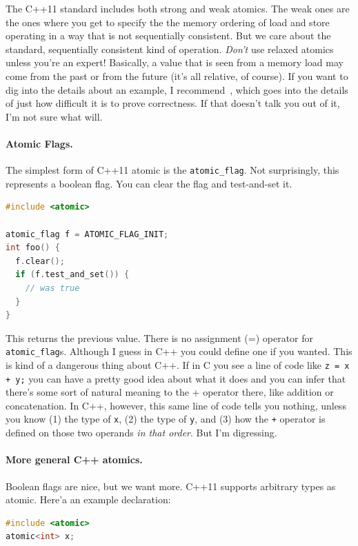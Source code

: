 \documentclass[a4paper]{report}
\begin{document}
The C++11 standard includes both strong and weak atomics. The weak ones are the ones where you get to specify the the memory ordering of load and store operating in a way that is not sequentially consistent. But we care about the standard, sequentially consistent kind of operation. \textit{Don't} use relaxed atomics unless you're an expert! Basically, a value that is seen from a memory load may come from the past or from the future (it's all relative, of course). If you want to dig into the details about an example, I recommend~\cite{bmref2}, which goes into the details of just how difficult it is to prove correctness. If that doesn't talk you out of it, I'm not sure what will.


\paragraph{Atomic Flags.} The simplest form of C++11 atomic is the {\tt atomic\_flag}.
Not surprisingly, this represents a boolean flag. You can clear the flag and test-and-set it.


\begin{lstlisting}[language=C++]
#include <atomic>

atomic_flag f = ATOMIC_FLAG_INIT;
int foo() {
  f.clear();
  if (f.test_and_set()) {
    // was true
  }
}
\end{lstlisting}

This returns the previous value. There is no assignment (=) operator for {\tt atomic\_flag}s. Although I guess in C++ you could define one if you wanted. This is kind of a dangerous thing about C++. If in C you see a line of code like \texttt{z = x + y;} you can have a pretty good idea about what it does and you can infer that there's some sort of natural meaning to the + operator there, like addition or concatenation. In C++, however, this same line of code tells you nothing, unless you know (1) the type of \texttt{x}, (2) the type of \texttt{y}, and (3) how the \texttt{+} operator is defined on those two operands \textit{in that order}. But I'm digressing.

\paragraph{More general C++ atomics.} Boolean flags are nice, but we want more.
C++11 supports arbitrary types as atomic. Here'a an example declaration:

\begin{lstlisting}[language=C++]
#include <atomic>
atomic<int> x;
\end{lstlisting}
\end{document}
